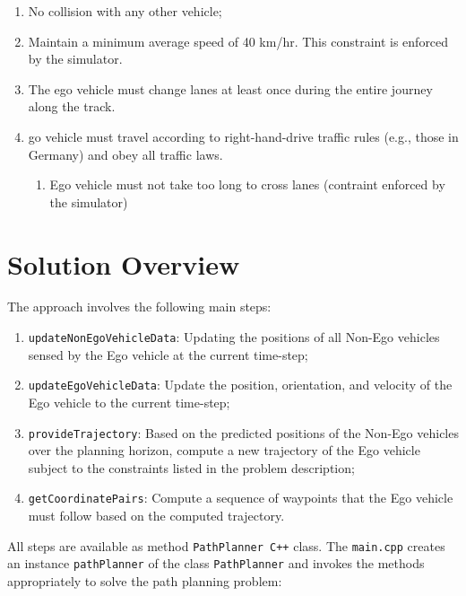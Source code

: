 \documentclass{article}
\begin{document}
\begin{enumerate}
    \item No collision with any other vehicle;
    \item Maintain a minimum average speed of 40 km/hr. This constraint is enforced by the simulator.
    \item The ego vehicle must change lanes at least once during the entire journey along the track.
    \item go vehicle must travel according to right-hand-drive traffic rules (e.g., those in Germany) and obey all traffic laws.
    \begin{enumerate}
        \item Ego vehicle must not take too long to cross lanes (contraint enforced by the simulator)
    \end{enumerate}
\end{enumerate}


\section{Solution Overview}
The approach involves the following main steps:
\begin{enumerate}
    \item \texttt{updateNonEgoVehicleData}: Updating the positions of all Non-Ego vehicles sensed by the Ego vehicle at the current time-step;
    \item \texttt{updateEgoVehicleData}: Update the position, orientation, and velocity of the Ego vehicle to the current time-step;
    \item \texttt{provideTrajectory}: Based on the predicted positions of the Non-Ego vehicles over the planning horizon, compute a new trajectory of the Ego vehicle subject to the constraints listed in the problem description;
    \item  \texttt{getCoordinatePairs}: Compute a sequence of waypoints that the Ego vehicle must follow based on the computed trajectory.
    
\end{enumerate}

All steps are available as method \texttt{PathPlanner C++} class.
The \texttt{main.cpp} creates an instance \texttt{pathPlanner} of the class \texttt{PathPlanner} and invokes the methods appropriately to solve the path planning problem:
\vspace*{1em}
\end{document}
